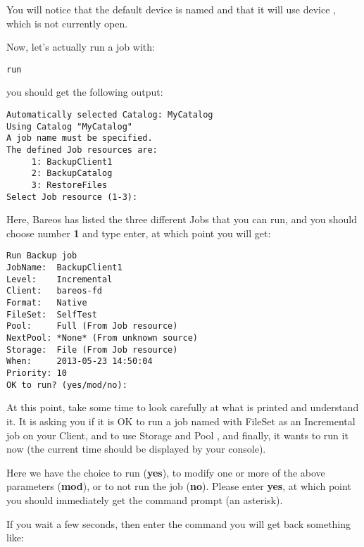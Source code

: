 You will notice that the default \bareosSd device is named  and
that it will use device , which is not currently open.

Now, let's actually run a job with:

\footnotesize
\begin{verbatim}
run
\end{verbatim}
\normalsize

you should get the following output:

\footnotesize
\begin{verbatim}
Automatically selected Catalog: MyCatalog
Using Catalog "MyCatalog"
A job name must be specified.
The defined Job resources are:
     1: BackupClient1
     2: BackupCatalog
     3: RestoreFiles
Select Job resource (1-3):
\end{verbatim}
\normalsize

Here, Bareos has listed the three different Jobs that you can run, and you
should choose number {\bf 1} and type enter, at which point you will get:

\footnotesize
\begin{verbatim}
Run Backup job
JobName:  BackupClient1
Level:    Incremental
Client:   bareos-fd
Format:   Native
FileSet:  SelfTest
Pool:     Full (From Job resource)
NextPool: *None* (From unknown source)
Storage:  File (From Job resource)
When:     2013-05-23 14:50:04
Priority: 10
OK to run? (yes/mod/no):
\end{verbatim}
\normalsize

At this point, take some time to look carefully at what is printed and
understand it. It is asking you if it is OK to run a job named 
with FileSet  as an Incremental job on your
Client, and to use Storage  and
Pool , and finally, it wants to run it now (the current time
should be displayed by your console).

Here we have the choice to run ({\bf yes}), to modify one or more of the above
parameters ({\bf mod}), or to not run the job ({\bf no}). Please enter {\bf
yes}, at which point you should immediately get the command prompt (an
asterisk).

If you wait a few seconds, then enter the command 
you will get back something like:


